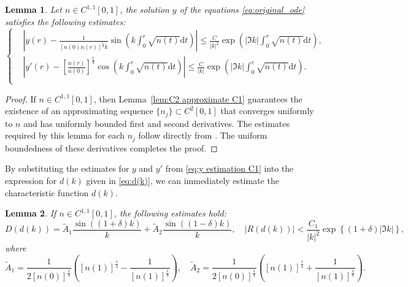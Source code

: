 \documentclass[11pt,reqno]{amsart}
\newtheorem{lemma}{Lemma}[section]
\theoremstyle{definition}
\theoremstyle{remark}
\numberwithin{equation}{section}
\begin{document}
\begin{lemma}\label{lem:estimation solution C1}
	Let $n\in C^{1,1}[0,1]$, the solution $ y $ of the equations \eqref{eq:original_ode} satisfies the following estimates:
	\begin{equation}\label{eq:y estimation C1}
		\left\{
		\begin{aligned}
			&\left| y(r) - \frac{1}{\left[n(0)n(r)\right]^{\frac{1}{4}} k} \sin\left(k \int_{0}^{r} \sqrt{n(t)} \mathrm{d} t\right) \right| \leq \frac{C}{|k|^2} \exp\left(\left|\Im k\right| \int_{0}^{r} \sqrt{n(t)} \mathrm{d} t\right), \text{~}\\
			&\left| y'(r) - \left[\frac{n(r)}{n(0)}\right]^{\frac{1}{4}} \cos\left(k \int_{0}^{r} \sqrt{n(t)} \mathrm{d} t\right) \right| \leq \frac{C}{|k|} \exp\left(\left|\Im k\right| \int_{0}^{r} \sqrt{n(t)} \mathrm{d} t\right). \text{~}\\
		\end{aligned}
		\right.
	\end{equation}
\end{lemma}

\begin{proof}
If $n \in C^{1,1}[0,1]$, then Lemma~\ref{lem:C2 approximate C1} guarantees the existence of an approximating sequence $\{n_j\} \subset C^2[0,1]$ that converges uniformly to $n$ and has uniformly bounded first and second derivatives. The estimates required by this lemma for each $n_j$ follow directly from \cite{AGP11,PT87}. The uniform boundedness of these derivatives completes the proof.
\end{proof}


By substituting the estimates for $ y $ and $ y' $ from \eqref{eq:y estimation C1} into the expression for $ d(k) $ given in \eqref{eq:d(k)}, we can immediately estimate the characteristic function $ d(k) $.

\begin{lemma}\label{lem:d(k) estimation C1}
	If $ n\in C^{1,1}[0,1] $, the following estimates hold:
\begin{equation}\label{eq:inequalites d(k) C1}
D(d(k))=\tilde{A}_1\frac{\sin{((1+\delta)k)}}{k}+\tilde{A}_2\frac{\sin{((1-\delta)k)}}{k}, \quad
|R(d(k))|<\frac{C_1}{|k|^2} \exp{\left\{(1+\delta)\left|\Im k\right|\right\}},
\end{equation}
where
\begin{equation*}
\tilde{A}_1=\frac{1}{2\left[n(0)\right]^{\frac{1}{4}}}\left(\left[n(1)\right]^{\frac{1}{4}}-\frac{1}{\left[n(1)\right]^{\frac{1}{4}}}\right), \quad \tilde{A}_2=\frac{1}{2\left[n(0)\right]^{\frac{1}{4}}}\left(\left[n(1)\right]^{\frac{1}{4}}+\frac{1}{\left[n(1)\right]^{\frac{1}{4}}}\right).
\end{equation*}
\end{lemma}
~\\
\end{document}

